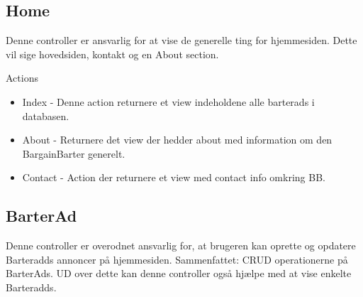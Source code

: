 \subsection{Home}
Denne controller er ansvarlig for at vise de generelle ting for hjemmesiden. Dette vil sige hovedsiden, kontakt og en About section.  

Actions
\begin{itemize}
	\item Index
	- Denne action returnere et view indeholdene alle barterads i databasen. 
	\item About
	- Returnere det view der hedder about med information om den BargainBarter generelt.
	\item Contact
	- Action der returnere et view med contact info omkring BB.
\end{itemize}


\subsection{BarterAd}
Denne controller er overodnet ansvarlig for, at brugeren kan oprette og opdatere Barteradds annoncer på hjemmesiden. Sammenfattet: CRUD operationerne på BarterAds. UD over dette kan denne controller også hjælpe med at vise enkelte Barteradds.

